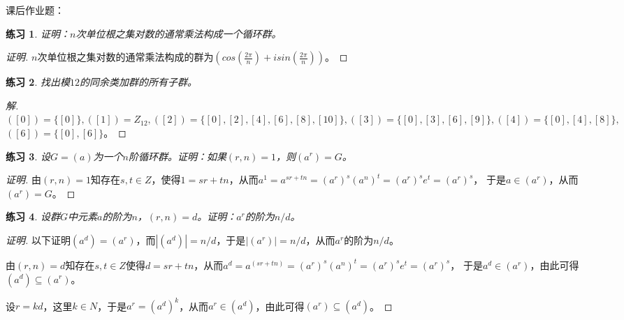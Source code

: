 \documentclass{article}
\newtheorem{Exercise}{练习}
\begin{document}
\begin{CJK*}{UTF8}{gbsn}
课后作业题：
\begin{Exercise}
证明：$n$次单位根之集对数的通常乘法构成一个循环群。
\end{Exercise}
\begin{proof}[证明]
  $n$次单位根之集对数的通常乘法构成的群为$(cos(\frac{2\pi}{n})+isin(\frac{2\pi}{n}))$。
\end{proof}
\begin{Exercise}
找出模$12$的同余类加群的所有子群。
\end{Exercise}
\begin{proof}[解]
  $([0])=\{[0]\},([1])=Z_{12},([2])=\{[0],[2],[4],[6],[8],[10]\},([3])=\{[0],[3],[6],[9]\},([4])=\{[0],[4],[8]\},$
  $([6])=\{[0],[6]\}$。

\end{proof}
\begin{Exercise}
  设$G=(a)$为一个$n$阶循环群。证明：如果$(r,n)=1$，则$(a^r)=G$。
\end{Exercise}

\begin{proof}[证明]
  由$(r,n)=1$知存在$s,t\in Z$，使得$1=sr+tn$，从而$a^1=a^{sr+tn}=(a^r)^s(a^n)^t=(a^r)^se^t=(a^r)^s$，
  于是$a\in (a^r)$，从而$(a^r)=G$。
\end{proof}
\begin{Exercise}
  设群$G$中元素$a$的阶为$n$，$(r,n)=d$。证明：$a^r$的阶为$n/d$。
\end{Exercise}
\begin{proof}[证明]
  以下证明$(a^d)=(a^r)$，而$|(a^d)|=n/d$，于是$|(a^r)|=n/d$，从而$a^r$的阶为$n/d$。

  由$(r,n)=d$知存在$s,t\in Z$使得$d=sr+tn$，从而$a^d=a^{(sr+tn)}=(a^r)^s(a^n)^t=(a^r)^se^t=(a^r)^s$，
  于是$a^d\in (a^r)$，由此可得$(a^d)\subseteq (a^r)$。

  设$r=kd$，这里$k\in N$，于是$a^r=(a^d)^k$，从而$a^r\in (a^d)$，由此可得$(a^r)\subseteq (a^d)$。
\end{proof}
\end{CJK*}
\end{document}
